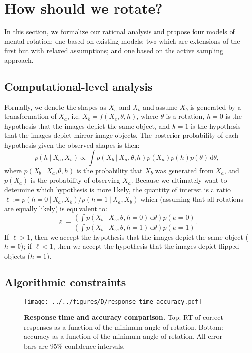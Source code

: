 \documentclass[10pt,letterpaper]{article}
\newcommand{\hi}[0]{h=0}
\newcommand{\hf}[0]{h=1}
\newcommand{\dif}[0]{\,\mathrm{d}}
\begin{document}
\section{How should we rotate?}

In this section, we formalize our rational analysis and propose four
models of mental rotation: one based on existing models; two which are
extensions of the first but with relaxed assumptions; and one based on
the active sampling approach.

\subsection{Computational-level analysis}

Formally, we denote the shapes as $X_a$ and $X_b$ and assume $X_b$ is
generated by a transformation of $X_a$, i.e. $X_b=f(X_a, \theta, h)$,
where $\theta$ is a rotation, $\hi$ is the hypothesis that the images
depict the same object, and $\hf$ is the hypothesis that the images
depict mirror-image objects. The posterior probability of each
hypothesis given the observed shapes is then:
\begin{equation}
  p(h\ \vert\ X_a, X_b) \propto \int p(X_b\ \vert\ X_a, \theta, h)p(X_a)p(h)p(\theta)\dif\theta,
  \label{eq:posterior}
\end{equation}
where $p(X_b\ \vert\ X_a, \theta, h)$ is the probability that $X_b$
was generated from $X_a$, and $p(X_a)$ is the probability of observing
$X_a$. Because we ultimately want to determine which hypothesis is
more likely, the quantity of interest is a ratio $\ell:=p(\hi\ \vert\
X_a, X_b) / p(\hf\ \vert\ X_a, X_b)$ which (assuming that all
rotations are equally likely) is equivalent to:
\begin{equation}
  \ell = \frac{\left(\int p(X_b\ \vert\ X_a, \theta, \hi)\dif\theta\right)p(\hi)}{\left(\int p(X_b\ \vert\ X_a, \theta, \hf)\dif\theta\right)p(\hf)}.
  \label{eq:lh-ratio}
\end{equation}
If $\ell > 1$, then we accept the hypothesis that the images depict
the same object ($\hi$); if $\ell < 1$, then we accept the hypothesis
that the images depict flipped objects ($\hf$).

\subsection{Algorithmic constraints}

\begin{figure*}[t]
  \begin{center}
    \texttt{[image: ../../figures/D/response\_time\_accuracy.pdf]}
    \caption{\textbf{Response time and accuracy comparison.} Top: RT
      of correct responses as a function of the minimum angle of
      rotation. Bottom: accuracy as a function of the minimum angle of
      rotation. All error bars are 95\% confidence intervals.}
    \label{fig:response-time-accuracy}
  \end{center}
\end{figure*}
\end{document}
